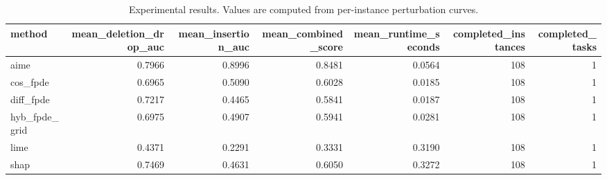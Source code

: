 \begin{table}[t]
\caption{Experimental results. Values are computed from per-instance perturbation curves.}
\label{tab:main_results_computed}
\centering
\begin{tabular}{lrrrrrr}
\toprule
method & mean\_deletion\_drop\_auc & mean\_insertion\_auc & mean\_combined\_score & mean\_runtime\_seconds & completed\_instances & completed\_tasks \\
\midrule
aime & 0.7966 & 0.8996 & 0.8481 & 0.0564 & 108 & 1 \\
cos\_fpde & 0.6965 & 0.5090 & 0.6028 & 0.0185 & 108 & 1 \\
diff\_fpde & 0.7217 & 0.4465 & 0.5841 & 0.0187 & 108 & 1 \\
hyb\_fpde\_grid & 0.6975 & 0.4907 & 0.5941 & 0.0281 & 108 & 1 \\
lime & 0.4371 & 0.2291 & 0.3331 & 0.3190 & 108 & 1 \\
shap & 0.7469 & 0.4631 & 0.6050 & 0.3272 & 108 & 1 \\
\bottomrule
\end{tabular}

\end{table}
